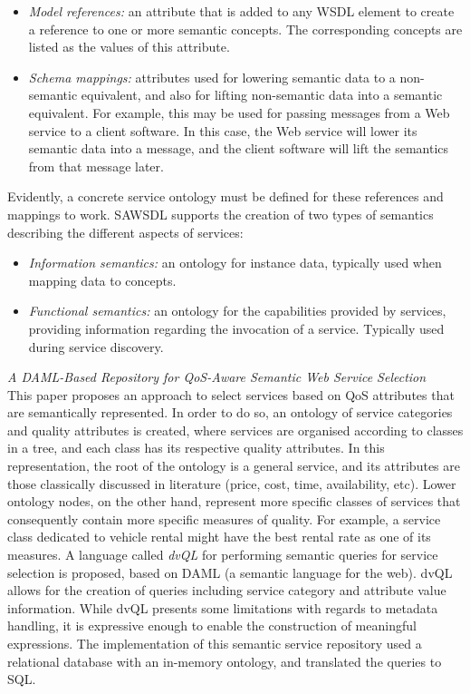 \begin{itemize}
 \item \textit{Model references:} an attribute that is added to any WSDL element to create a reference to one or more semantic concepts. The corresponding concepts are listed as
 the values of this attribute.
 \item \textit{Schema mappings:} attributes used for lowering semantic data to a non-semantic equivalent, and also for lifting non-semantic data into a semantic equivalent. For
 example, this may be used for passing messages from a Web service to a client software. In this case, the Web service will lower its semantic data into a message, and the client
 software will lift the semantics from that message later.
\end{itemize}

Evidently, a concrete service ontology must be defined for these references and mappings to work. SAWSDL supports the creation of two types of semantics describing the different
aspects of services:

\begin{itemize}
 \item \textit{Information semantics:} an ontology for instance data, typically used when mapping data to concepts.
 \item \textit{Functional semantics:} an ontology for the capabilities provided by services, providing information regarding the invocation of a service. Typically used during service discovery.
\end{itemize}

\textit{A DAML-Based Repository for QoS-Aware Semantic Web Service Selection \cite{soydan2004daml}}\\
This paper proposes an approach to select services based on QoS attributes that are semantically represented. In order to do so, an ontology of service categories and quality attributes is created, where services are organised according to classes in a tree, and each class has its respective quality attributes. In this representation, the root of the ontology is a general service, and its attributes are those classically discussed in literature (price, cost, time, availability, etc). Lower ontology nodes, on the other hand, represent more specific classes of services that consequently contain more specific measures of quality. For example, a service class dedicated to vehicle rental might have the best rental rate as one of its measures. A language called \textit{dvQL} for performing semantic queries for service selection is proposed, based on DAML (a semantic language for the web). dvQL allows for the creation of queries including service category and attribute value information. While dvQL presents some limitations with regards to metadata handling, it is expressive enough to enable the construction of meaningful expressions. The implementation of this semantic service repository used a relational database with an in-memory ontology, and translated the queries to SQL.

